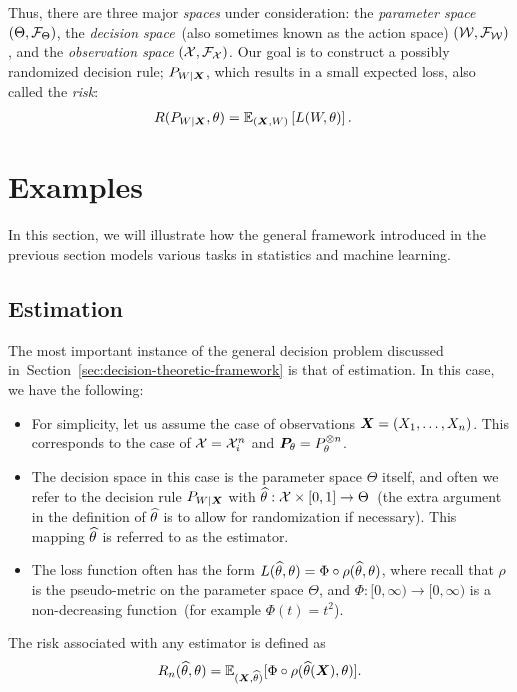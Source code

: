 \documentclass[12pt]{article}
\begin{document}
Thus, there are three major \emph{spaces} under consideration: the \emph{parameter space} $(\Theta, \calF_\Theta)$, the \emph{decision space}~(also sometimes known as the action space) $(\calW, \calF_\calW)$, and the \emph{observation space} $(\calX, \calF_\calX)$. Our goal is to construct a possibly randomized decision rule; $P_{W|\X}$, which results in a small expected loss, also called the \emph{risk}: 
\begin{align}
	R(P_{W|\X}, \theta) & = \mathbb{E}_{(\X, W)}\lb L(W, \theta) \rb. 
\end{align}

\section{Examples} 
\label{sec:examples}
In this section, we will illustrate how the general framework introduced in the previous section models various tasks in statistics and machine learning. 

\subsection{Estimation}
\label{subsec:estimation}
	The most important instance of the general decision problem discussed in~Section~\ref{sec:decision-theoretic-framework} is that of estimation. In this case, we have the following: 
	\begin{itemize}
		\item For simplicity, let us assume the case of \iid observations $\X = (X_1, \ldots, X_n)$. This corresponds to the case of $\calX = \calX_i^n$ and $\P_\theta =  P_\theta^{\otimes n}$. 
		\item The decision space in this case is the parameter space $\Theta$ itself, and often we refer to the decision rule $P_{W|\X}$ with $\thetahat:\calX \times [0, 1] \to \Theta$~(the extra argument in the definition of $\thetahat$ is to allow for randomization if necessary). This mapping $\thetahat$ is referred to as the estimator. 
		
		\item The loss function often has the form $L(\thetahat, \theta) = \Phi \circ \rho(\thetahat, \theta)$, where recall that $\rho$ is the pseudo-metric on the parameter space $\Theta$, and $\Phi:[0, \infty) \to [0, \infty)$ is a non-decreasing function~(for example $\Phi(t) = t^2$). 
	\end{itemize}
	The risk associated with any estimator is defined as 
	\begin{align}
	R_n(\thetahat, \theta) = \mathbb{E}_{(\X, \thetahat)}[\Phi \circ \rho(\thetahat(\X), \theta)]. 
	\end{align}
	
\end{document}
